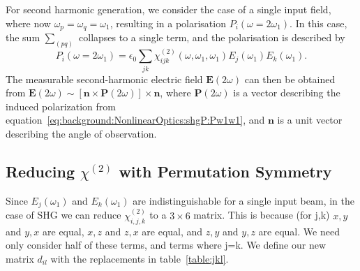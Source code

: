 For second harmonic generation, we consider the case of a single input field, where now $\omega_{p}=\omega_{q}=\omega_{1}$, resulting in a polarisation $P_{i}(\omega=2\omega_{1} )$. In this case, the sum $\sum_{(pq)}$ collapses to a single term, and the polarisation is described by
\begin{equation}\label{eq:background:NonlinearOptics:shgP:Pw1w1}
	P_{i}(\omega=2\omega_{1} ) =  \epsilon_{0} \sum_{jk}
				\chi^{(2)}_{ijk}(\omega, \omega_{1},\omega_{1} ) 
				E_{j}(\omega_{1} ) E_{k}(\omega_{1} ).
\end{equation}
The measurable second-harmonic electric field $\mathbf{E}(2\omega)$ can then be obtained from $\mathbf{E}(2\omega)\sim[\mathbf{n}\times\mathbf{P}(2\omega)]\times\mathbf{n}$, where $\mathbf{P}(2\omega)$ is a vector describing the induced polarization from equation~\ref{eq:background:NonlinearOptics:shgP:Pw1w1}, and $\mathbf{n}$ is a unit vector describing the angle of observation. 


\subsection{Reducing \texorpdfstring{$\chi^{(2)}$}{Lg} with Permutation Symmetry}\label{sec:background:NonlinearOptics:permutation}
Since $E_{j}(\omega_{1} )$ and $E_{k}(\omega_{1} )$ are indistinguishable for a single input beam, in the case of SHG we can reduce $\chi^{(2)}_{i, j, k}$ to a $3\times6$ matrix. This is because (for j,k) $x,y$ and $y,x$ are equal, $x,z$ and $z,x$ are equal, and $z,y$ and $y,z$ are equal. We need only consider half of these terms, and terms where j=k. We define our new matrix $d_{il}$ with the replacements in table~\ref{table:jkl}.

